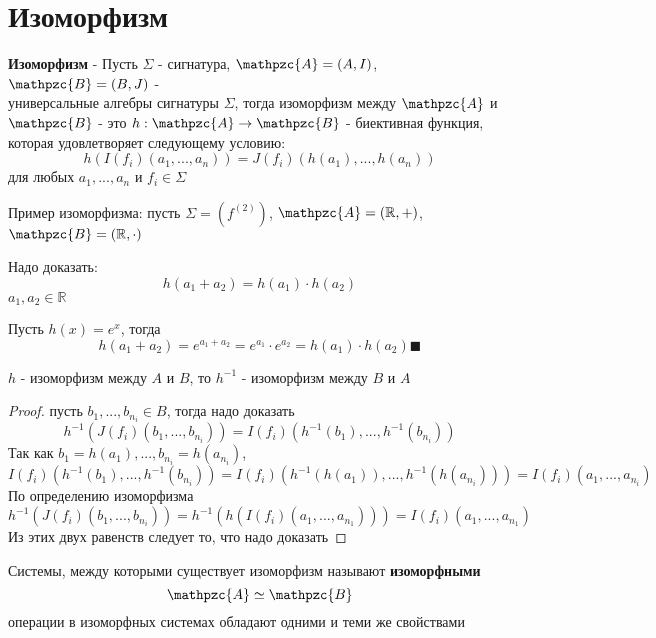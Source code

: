 \documentclass[../main/document.tex]{subfiles}
\begin{document}
\section{Изоморфизм}
\begin{dfn}
\textbf{Изоморфизм} - Пусть $\Sigma$ - сигнатура, $\mathpzc{A}=(A,I)$, $\mathpzc{B}=(B,J)$ - \\
 универсальные алгебры сигнатуры $\Sigma$, тогда изоморфизм между $\mathpzc{A}$ и $\mathpzc{B}$ - это $h:\mathpzc{A}\rightarrow \mathpzc{B}$ - биективная функция, которая удовлетворяет следующему условию:
$$h(I(f_i)(a_1,...,a_n))=J(f_i)(h(a_1),...,h(a_n))$$
для любых $a_1,...,a_n$ и $f_i\in \Sigma$
\end{dfn}

\begin{exm}
Пример изоморфизма: пусть $\Sigma=(f^{(2)})$, $\mathpzc{A}=(\mathbb{R},+)$, $\mathpzc{B}=(\mathbb{R},\cdot)$

Надо доказать: 
$$h(a_1+a_2)=h(a_1)\cdot h(a_2)$$
$a_1,a_2\in \mathbb{R}$

Пусть $h(x)=e^x$, тогда
$$h(a_1+a_2)=e^{a_1+a_2}=e^{a_1}\cdot e^{a_2}=h(a_1)\cdot h(a_2)\blacksquare$$
\end{exm}

\begin{thm}\label{isomorphism-inverse}
$h$ - изоморфизм между $A$ и $B$, то $h^{-1}$ - изоморфизм между $B$ и $A$
\begin{proof} пусть $b_1,...,b_{n_i}\in B$, тогда надо доказать
$$h^{-1}(J(f_i)(b_1,...,b_{n_i}))=I(f_i)(h^{-1}(b_1),...,h^{-1}(b_{n_i}))$$
Так как $b_1=h(a_1),...,b_{n_i}=h(a_{n_i})$,
$$I(f_i)(h^{-1}(b_1),...,h^{-1}(b_{n_i}))=I(f_i)(h^{-1}(h(a_1)),...,h^{-1}(h(a_{n_i})))=I(f_i)(a_1,...,a_{n_i})$$
По определению изоморфизма
$$h^{-1}(J(f_i)(b_1,...,b_{n_i}))=h^{-1}(h(I(f_i)(a_1,...,a_{n_1})))=I(f_i)(a_1,...,a_{n_1})$$
Из этих двух равенств следует то, что надо доказать
\end{proof}
\end{thm}

\begin{dfn}
Системы, между которыми существует изоморфизм называют \textbf{изоморфными}
$$\mathpzc{A}\simeq\mathpzc{B}$$
операции в изоморфных системах обладают одними и теми же свойствами
\end{dfn}
\end{document}
